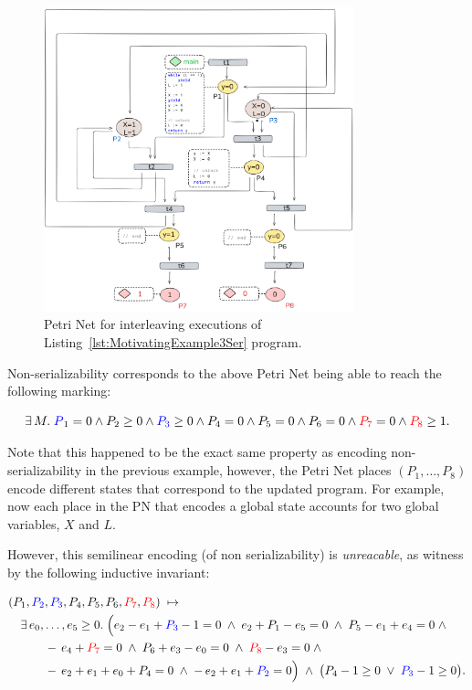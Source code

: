 \begin{figure}[H]
	\centering
	\includegraphics[width=0.8\textwidth]{plots/code_3_PN_with_annotation.png}
	\caption{Petri Net for interleaving executions of Listing~\ref{lst:MotivatingExample3Ser} program.}
	\label{fig:code3ExamplePN}
\end{figure}

Non-serializability corresponds to the above Petri Net being able to reach the following marking:

\[
\exists\,M.\; \textcolor{blue}
P_1 = 0 \wedge 
{P_2} \ge 0 \wedge \textcolor{blue}{P_3} \ge 0  \wedge P_4 = 0
\wedge P_5 = 0 \wedge P_6 = 0 \wedge \textcolor{red}{P_7} = 0 \wedge \textcolor{red}{P_8} \ge 1.
\]


Note that this happened to be the exact same property as encoding non-serializability in the previous example, however, the Petri Net places $(P_1,\ldots,P_8)$ encode different states that correspond to the updated program. For example, now each place in the PN that encodes a global state accounts for two global variables, $X$ and $L$. 

However, this semilinear encoding (of non serializability) is \textit{unreacable}, as witness by the following inductive invariant:


\[
\begin{aligned}
	&(P_{1},\textcolor{blue}{P_{2}},\textcolor{blue}{P_{3}},P_{4},P_{5},P_{6},\textcolor{red}{P_{7}},\textcolor{red}{P_{8}})
	\;\mapsto\;\\
	&\quad
	\exists\,e_{0},\dots,e_{5}\ge0.\;
	\Bigl(
	e_{2}-e_{1}+\textcolor{blue}{P_{3}}-1=0\;\land\;
	e_{2}+P_{1}-e_{5}=0\;\land\;
	P_{5}-e_{1}+e_{4}=0\;\land\\
	&\qquad\quad
	-\,e_{4}+\textcolor{red}{P_{7}}=0\;\land\;
	P_{6}+e_{3}-e_{0}=0\;\land\;
	\textcolor{red}{P_{8}}-e_{3}=0\;\land\\
	&\qquad\quad
	-\,e_{2}+e_{1}+e_{0}+P_{4}=0\;\land\;
	-\,e_{2}+e_{1}+\textcolor{blue}{P_{2}}=0
	\Bigr)
	\;\land\;
	\bigl(P_{4}-1\ge0\;\lor\;\textcolor{blue}{P_{3}}-1\ge0\bigr).
\end{aligned}
\]



\newpage